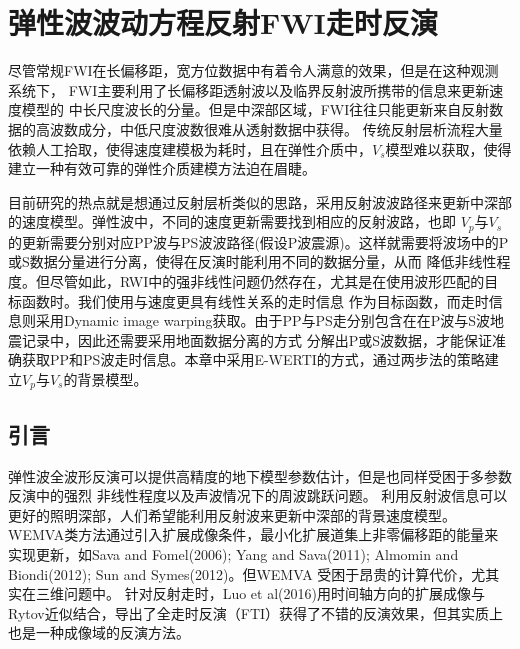 



\chapter{弹性波波动方程反射FWI走时反演}

尽管常规FWI在长偏移距，宽方位数据中有着令人满意的效果，但是在这种观测系统下，
FWI主要利用了长偏移距透射波以及临界反射波所携带的信息来更新速度模型的
中长尺度波长的分量。但是中深部区域，FWI往往只能更新来自反射数据的高波数成分，中低尺度波数很难从透射数据中获得。
传统反射层析流程大量依赖人工拾取，使得速度建模极为耗时，且在弹性介质中，$V_s$模型难以获取，使得建立一种有效可靠的弹性介质建模方法迫在眉睫。

目前研究的热点就是想通过反射层析类似的思路，采用反射波波路径来更新中深部的速度模型。弹性波中，不同的速度更新需要找到相应的反射波路，也即
$V_p$与$V_s$的更新需要分别对应PP波与PS波波路径(假设P波震源)。这样就需要将波场中的P或S数据分量进行分离，使得在反演时能利用不同的数据分量，从而
降低非线性程度。但尽管如此，RWI中的强非线性问题仍然存在，尤其是在使用波形匹配的目标函数时。我们使用与速度更具有线性关系的走时信息
作为目标函数，而走时信息则采用Dynamic image warping获取。由于PP与PS走分别包含在在P波与S波地震记录中，因此还需要采用地面数据分离的方式
分解出P或S波数据，才能保证准确获取PP和PS波走时信息。本章中采用E-WERTI的方式，通过两步法的策略建立$V_p$与$V_s$的背景模型。

\section{引言}
弹性波全波形反演可以提供高精度的地下模型参数估计，但是也同样受困于多参数反演中的强烈
非线性程度以及声波情况下的周波跳跃问题\cite[]{sears:2008,brossier2009}。
利用反射波信息可以更好的照明深部，人们希望能利用反射波来更新中深部的背景速度模型。
WEMVA类方法通过引入扩展成像条件，最小化扩展道集上非零偏移距的能量来实现更新，如Sava and
Fomel(2006)\cite{SavaEtAl2006}; Yang and Sava(2011)\cite{YangEtAl2011}; Almomin and
Biondi(2012)\cite{Almomin2012}; Sun and Symes(2012)\cite{SunEtAl2012}。但WEMVA
受困于昂贵的计算代价，尤其实在三维问题中。
针对反射走时，Luo et
al(2016)\cite{Luo2016}用时间轴方向的扩展成像与Rytov近似结合，导出了全走时反演（FTI）获得了不错的反演效果，但其实质上也是一种成像域的反演方法。

